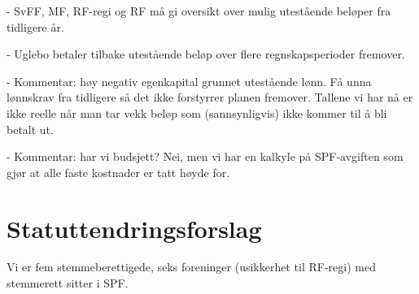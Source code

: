 \documentclass{article}[12pt]
\begin{document}
	- SvFF, MF, RF-regi og RF må gi oversikt over mulig utestående beløper fra
	tidligere år.
	
	- Uglebo betaler tilbake utestående beløp over flere regnskapsperioder fremover.
	
	- Kommentar: høy negativ egenkapital grunnet utestående lønn. 
	Få unna lønnskrav fra tidligere så det ikke forstyrrer planen fremover.
	Tallene vi har nå er ikke reelle når man tar vekk beløp som (sannsynligvis) 
	ikke kommer til å bli
	betalt ut.
	
	- Kommentar: har vi budsjett? Nei, men vi har en kalkyle på SPF-avgiften som
	gjør at alle faste kostnader er tatt høyde for.  

\section{Statuttendringsforslag}
	Vi er fem stemmeberettigede, seks foreninger (usikkerhet til RF-regi) 
	med stemmerett sitter i SPF.
\end{document}
